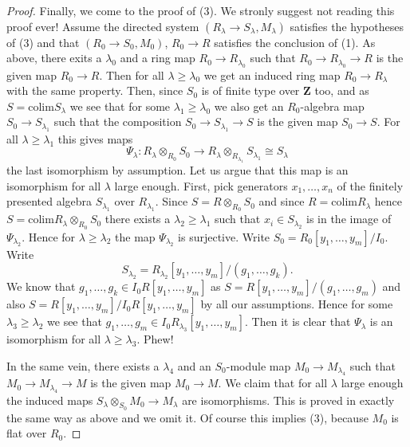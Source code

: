 \begin{proof}
\medskip\noindent
Finally, we come to the proof of (3). We stronly suggest not reading
this proof ever!
Assume the directed system $(R_\lambda \to S_\lambda, M_\lambda)$
satisfies the hypotheses of (3) and that
$(R_0 \to S_0, M_0)$, $R_0 \to R$ satisfies the conclusion of (1).
As above, there exits a $\lambda_0$ and a ring map
$R_0 \to R_{\lambda_0}$ such that $R_0 \to R_{\lambda_0} \to R$ is the
given map $R_0 \to R$. Then for all $\lambda \geq \lambda_0$
we get an induced ring map $R_0 \to R_\lambda$ with the same property.
Then, since $S_0$ is of finite type over $\mathbf{Z}$
too, and as $S = \text{colim} S_\lambda$ we see that for some
$\lambda_1 \geq \lambda_0$ we also get an $R_0$-algebra map
$S_0 \to S_{\lambda_1}$
such that the composition $S_0 \to S_{\lambda_1} \to S$ is the given
map $S_0 \to S$. For all $\lambda \geq \lambda_1$ this gives
maps
$$
\Psi_{\lambda} :
R_\lambda \otimes_{R_0} S_0
\longrightarrow
R_\lambda \otimes_{R_{\lambda_1}} S_{\lambda_1}
\cong
S_\lambda
$$
the last isomorphism by assumption. Let us argue that this map is an
isomorphism for all $\lambda$ large enough. First, pick generators
$x_1, \ldots, x_n$ of the finitely presented algebra $S_{\lambda_1}$
over $R_{\lambda_1}$. Since $S = R \otimes_{R_0} S_0$ and since
$R = \text{colim} R_\lambda$ hence
$S = \text{colim} R_\lambda \otimes_{R_0} S_0$
there exists a $\lambda_2 \geq \lambda_1$ such
that $x_i \in S_{\lambda_2}$ is in the image of $\Psi_{\lambda_2}$.
Hence for $\lambda \geq \lambda_2$ the map $\Psi_{\lambda_2}$ is surjective.
Write $S_0 = R_0[y_1, \ldots, y_m]/I_0$. Write
$$
S_{\lambda_2} = R_{\lambda_2}[y_1, \ldots, y_m]/(g_1, \ldots, g_k).
$$
We know that $g_1, \ldots, g_k \in I_0R[y_1, \ldots, y_m]$
as $S = R[y_1, \ldots, y_m]/(g_1, \ldots, g_m)$ and also
$S = R[y_1, \ldots, y_m]/I_0R[y_1, \ldots, y_m]$ by all our assumptions.
Hence for some $\lambda_3 \geq \lambda_2$ we see that
$g_1, \ldots, g_m \in I_0R_{\lambda_3}[y_1, \ldots, y_m]$.
Then it is clear that $\Psi_{\lambda}$ is an isomorphism for
all $\lambda \geq \lambda_3$. Phew!

\medskip\noindent
In the same vein, there exists a $\lambda_4$ and an $S_0$-module map
$M_0 \to M_{\lambda_4}$ such that $M_0 \to M_{\lambda_4} \to M$ is the given
map $M_0 \to M$. We claim that for all $\lambda$ large enough
the induced maps $S_\lambda \otimes_{S_0} M_0 \to M_\lambda$ are isomorphisms.
This is proved in exactly the same way as above and we omit it.
Of course this implies (3), because $M_0$ is flat over $R_0$.
\end{proof}

